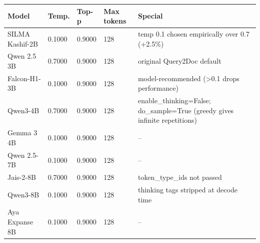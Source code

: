 \begin{tabular}{lllll}
\toprule
Model & Temp. & Top-p & Max tokens & Special \\
\midrule
SILMA Kashif-2B & 0.1000 & 0.9000 & 128 & temp 0.1 chosen empirically over 0.7 (+2.5\%) \\
Qwen 2.5 3B & 0.7000 & 0.9000 & 128 & original Query2Doc default \\
Falcon-H1-3B & 0.1000 & 0.9000 & 128 & model-recommended (>0.1 drops performance) \\
Qwen3-4B & 0.7000 & 0.9000 & 128 & enable\_thinking=False; do\_sample=True (greedy gives infinite repetitions) \\
Gemma 3 4B & 0.1000 & 0.9000 & 128 & -- \\
Qwen 2.5-7B & 0.1000 & 0.9000 & 128 & -- \\
Jais-2-8B & 0.7000 & 0.9000 & 128 & token\_type\_ids not passed \\
Qwen3-8B & 0.1000 & 0.9000 & 128 & thinking tags stripped at decode time \\
Aya Expanse 8B & 0.1000 & 0.9000 & 128 & -- \\
\bottomrule
\end{tabular}
